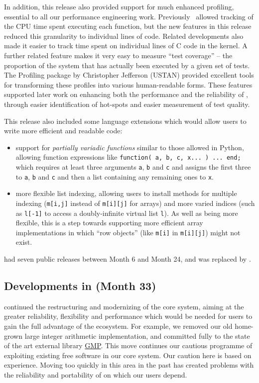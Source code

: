 In addition, this release also provided support for much enhanced
profiling, essential to all our performance engineering work.
Previously \GAP\ allowed tracking of the CPU time spent
executing each function, but the new features in this release
reduced this granularity to individual lines of \GAP
code. Related developments also made it easier to track time spent on
individual lines of C code in the \GAP kernel. A further related
feature makes it very easy to measure ``test coverage'' -- the
proportion of the system that has actually been executed by a given
set of tests. The {\sf Profiling} package \cite{profiling} by Christopher Jefferson
(USTAN) provided excellent tools for transforming these profiles into
various human-readable forms. These features supported later work on
enhancing both the performance and the reliability of \GAP, through
easier identification of hot-spots and easier measurement of test
quality.

This release also included some language extensions which would allow
users to write more efficient and readable code:

\begin{itemize}
  \item support for \emph{partially
  variadic functions} similar to those allowed in Python, allowing
function expressions like
\verb|function( a, b, c, x... ) ... end;|
which requires at least three arguments \verb|a|, \verb|b| and
\verb|c| and assigns the first three to \verb|a|, \verb|b| and \verb|c|
and then a list containing any remaining ones to \verb|x|.
\item more flexible list indexing, allowing users to install methods
  for multiple indexing (\verb|m[i,j]| instead of \verb|m[i][j]| for
  arrays) and more varied indices (such as \verb|l[-1]| to access a
  doubly-infinite virtual list \verb|l|). As well as being more
  flexible, this is a step towards supporting more efficient array
  implementations in which ``row objects'' (like \verb|m[i]| in
  \verb|m[i][j]|) might not exist.
\end{itemize}

 had seven public releases between Month 6 and Month 24, and
was replaced by .

\subsection{Developments in  (Month 33)}\label{gap-4.9}

 continued the restructuring and modernizing of the core \GAP
system, aiming at the greater reliability, flexibility and performance
which would be needed for \GAP users to gain the full advantage of the \ODK ecosystem.
For example, we removed our old home-grown large integer arithmetic
implementation, and committed fully to the state of the art external
library \href{???}{GMP}. This
move continues our cautious programme of exploiting existing free
software in our core system. Our caution here is based on
experience. Moving too quickly in this area in the past has created
problems with the reliability and
portability of \GAP on which our users depend.

